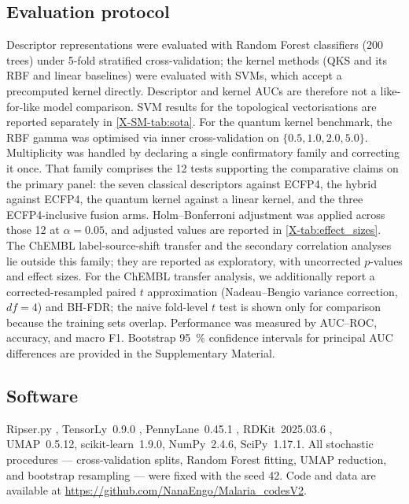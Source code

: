 \documentclass[11pt,a4paper]{article}
\begin{document}
\subsection{Evaluation protocol}

Descriptor representations were evaluated with Random Forest classifiers (\num{200} trees) under 5-fold stratified cross-validation; the kernel methods (QKS and its RBF and linear baselines) were evaluated with SVMs, which accept a precomputed kernel directly. Descriptor and kernel AUCs are therefore not a like-for-like model comparison. SVM results for the topological vectorisations are reported separately in \cref{X-SM-tab:sota}. For the quantum kernel benchmark, the RBF gamma was optimised via inner cross-validation on $\{0.5, 1.0, 2.0, 5.0\}$. Multiplicity was handled by declaring a single confirmatory family and correcting it once. That family comprises the \num{12} tests supporting the comparative claims on the primary panel: the seven classical descriptors against ECFP4, the hybrid against ECFP4, the quantum kernel against a linear kernel, and the three ECFP4-inclusive fusion arms. Holm--Bonferroni adjustment was applied across those \num{12} at $\alpha = \num{0.05}$, and adjusted values are reported in \cref{X-tab:effect_sizes}. The ChEMBL label-source-shift transfer and the secondary correlation analyses lie outside this family; they are reported as exploratory, with uncorrected $p$-values and effect sizes. For the ChEMBL transfer analysis, we additionally report a corrected-resampled paired $t$ approximation (Nadeau--Bengio variance correction, $df = 4$) and BH-FDR; the naive fold-level $t$ test is shown only for comparison because the training sets overlap. Performance was measured by AUC--ROC, accuracy, and macro F1. Bootstrap \qty{95}{\percent} confidence intervals for principal AUC differences are provided in the Supplementary Material.

\subsection{Software}

Ripser.py \citep{ripser_2019}, TensorLy~0.9.0 \citep{tensorly_2019}, PennyLane~0.45.1 \citep{pennylane_2024}, RDKit~2025.03.6 \citep{rdkit_2024}, UMAP~0.5.12, scikit-learn~1.9.0, NumPy~2.4.6, SciPy~1.17.1. All stochastic procedures --- cross-validation splits, Random Forest fitting, UMAP reduction, and bootstrap resampling --- were fixed with the seed \num{42}. Code and data are available at \url{https://github.com/NanaEngo/Malaria_codesV2}.
\end{document}
